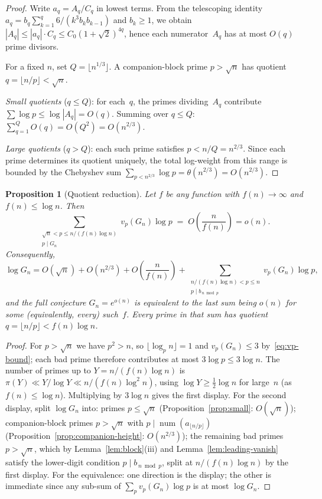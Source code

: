 \documentclass[11pt]{article}
\newtheorem{proposition}[theorem]{Proposition}
\theoremstyle{definition}
\theoremstyle{remark}
\begin{document}
\begin{proof}
Write $a_q = A_q / C_q$ in lowest terms.
From the telescoping identity
$a_q = b_q \sum_{k=1}^q 6/(k^3 b_k b_{k-1})$
and $b_k \ge 1$, we obtain
$|A_q| \le |a_q| \cdot C_q \le C_0 (1+\sqrt{2})^{4q}$,
hence each numerator~$A_q$ has at most $O(q)$ prime divisors.

For a fixed $n$, set $Q = \lfloor n^{1/3} \rfloor$.
A companion-block prime $p > \sqrt{n}$ has quotient
$q = \lfloor n/p \rfloor < \sqrt{n}$.

\emph{Small quotients} ($q \le Q$):
for each~$q$, the primes dividing~$A_q$ contribute
$\sum \log p \le \log|A_q| = O(q)$.
Summing over $q \le Q$:
$\sum_{q=1}^Q O(q) = O(Q^2) = O(n^{2/3})$.

\emph{Large quotients} ($q > Q$):
each such prime satisfies
$p < n/Q = n^{2/3}$.
Since each prime determines its quotient uniquely,
the total log-weight from this range is bounded by
the Chebyshev sum $\sum_{p < n^{2/3}} \log p
= \theta(n^{2/3}) = O(n^{2/3})$.
\end{proof}

\begin{proposition}[Quotient reduction]\label{prop:quotient-reduction}
Let $f$ be any function with $f(n) \to \infty$ and
$f(n) \le \log n$. Then
\[
  \sum_{\substack{\sqrt{n} < p \le n/(f(n)\log n) \\ p \mid G_n}}
  v_p(G_n) \log p
  \;=\; O\!\left(\frac{n}{f(n)}\right) = o(n).
\]
Consequently,
\[
  \log G_n = O(\sqrt{n}) + O(n^{2/3})
  + O\!\left(\frac{n}{f(n)}\right)
  + \sum_{\substack{n/(f(n)\log n) < p \le n \\
      p \mid b_{\,n \bmod p}}}
    v_p(G_n)\log p ,
\]
and the full conjecture $G_n = e^{o(n)}$ is equivalent to
the last sum being $o(n)$ for some (equivalently, every)
such~$f$. Every prime in that sum has quotient
$q = \lfloor n/p\rfloor < f(n)\log n$.
\end{proposition}

\begin{proof}
For $p > \sqrt{n}$ we have $p^2 > n$, so
$\lfloor \log_p n\rfloor = 1$ and $v_p(G_n) \le 3$
by~\eqref{eq:vp-bound}; each bad prime therefore
contributes at most $3\log p \le 3\log n$.
The number of primes up to $Y = n/(f(n)\log n)$ is
$\pi(Y) \ll Y/\log Y \ll n/(f(n)\log^2 n)$,
using $\log Y \ge \tfrac12 \log n$ for large~$n$
(as $f(n) \le \log n$).
Multiplying by $3 \log n$ gives the first display.
For the second display, split $\log G_n$ into:
primes $p \le \sqrt{n}$
(Proposition~\ref{prop:small}: $O(\sqrt n)$);
companion-block primes $p > \sqrt n$ with
$p \mid \operatorname{num}(a_{\lfloor n/p\rfloor})$
(Proposition~\ref{prop:companion-height}: $O(n^{2/3})$);
the remaining bad primes $p > \sqrt{n}$, which by
Lemma~\ref{lem:block}(iii) and
Lemma~\ref{lem:leading-vanish} satisfy the lower-digit
condition $p \mid b_{\,n\bmod p}$, split at
$n/(f(n)\log n)$ by the first display.
For the equivalence: one direction is the display; the
other is immediate since any sub-sum of
$\sum_p v_p(G_n)\log p$ is at most $\log G_n$.
\end{proof}
\end{document}
